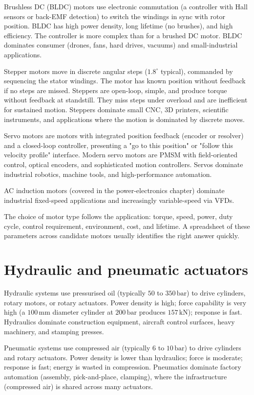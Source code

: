 Brushless DC (BLDC) motors use electronic commutation (a controller with Hall sensors or back-EMF detection) to switch the windings in sync with rotor position. BLDC has high power density, long lifetime (no brushes), and high efficiency. The controller is more complex than for a brushed DC motor. BLDC dominates consumer (drones, fans, hard drives, vacuums) and small-industrial applications.

Stepper motors move in discrete angular steps ($1.8^\circ$ typical), commanded by sequencing the stator windings. The motor has known position without feedback if no steps are missed. Steppers are open-loop, simple, and produce torque without feedback at standstill. They miss steps under overload and are inefficient for sustained motion. Steppers dominate small CNC, $3$D printers, scientific instruments, and applications where the motion is dominated by discrete moves.

Servo motors are motors with integrated position feedback (encoder or resolver) and a closed-loop controller, presenting a "go to this position" or "follow this velocity profile" interface. Modern servo motors are PMSM with field-oriented control, optical encoders, and sophisticated motion controllers. Servos dominate industrial robotics, machine tools, and high-performance automation.

AC induction motors (covered in the power-electronics chapter) dominate industrial fixed-speed applications and increasingly variable-speed via VFDs.

The choice of motor type follows the application: torque, speed, power, duty cycle, control requirement, environment, cost, and lifetime. A spreadsheet of these parameters across candidate motors usually identifies the right answer quickly.

\section{Hydraulic and pneumatic actuators}

Hydraulic systems use pressurised oil (typically $50$ to $350\,\text{bar}$) to drive cylinders, rotary motors, or rotary actuators. Power density is high; force capability is very high (a $100\,\text{mm}$ diameter cylinder at $200\,\text{bar}$ produces $157\,\text{kN}$); response is fast. Hydraulics dominate construction equipment, aircraft control surfaces, heavy machinery, and stamping presses.

Pneumatic systems use compressed air (typically $6$ to $10\,\text{bar}$) to drive cylinders and rotary actuators. Power density is lower than hydraulics; force is moderate; response is fast; energy is wasted in compression. Pneumatics dominate factory automation (assembly, pick-and-place, clamping), where the infrastructure (compressed air) is shared across many actuators.

